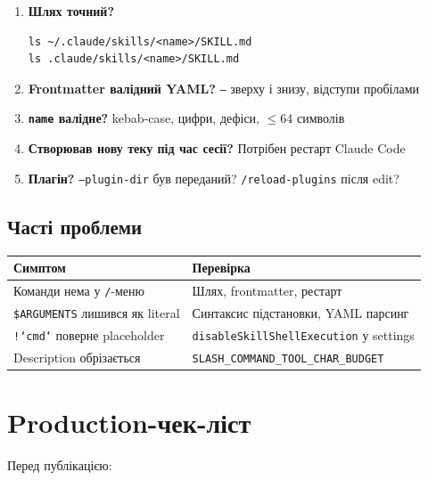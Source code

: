 \documentclass[11pt,a4paper]{article}
\begin{document}
\begin{enumerate}
\item \textbf{Шлях точний?}
  \begin{lstlisting}
ls ~/.claude/skills/<name>/SKILL.md
ls .claude/skills/<name>/SKILL.md
  \end{lstlisting}

\item \textbf{Frontmatter валідний YAML?} \texttt{---} зверху і знизу, відступи пробілами

\item \textbf{\texttt{name} валідне?} kebab-case, цифри, дефіси, $\le$64 символів

\item \textbf{Створював нову теку під час сесії?} Потрібен рестарт Claude Code

\item \textbf{Плагін?} \texttt{--plugin-dir} був переданий? \texttt{/reload-plugins} після edit?
\end{enumerate}

\subsection{Часті проблеми}

\begin{tabular}{ll}
\hline
\textbf{Симптом} & \textbf{Перевірка} \\
\hline
Команди нема у \texttt{/}-меню & Шлях, frontmatter, рестарт \\
\texttt{\$ARGUMENTS} лишився як literal & Синтаксис підстановки, YAML парсинг \\
\texttt{!`cmd`} поверне placeholder & \texttt{disableSkillShellExecution} у settings \\
Description обрізається & \texttt{SLASH\_COMMAND\_TOOL\_CHAR\_BUDGET} \\
\hline
\end{tabular}

\section{Production-чек-ліст}

Перед публікацією:
\end{document}
